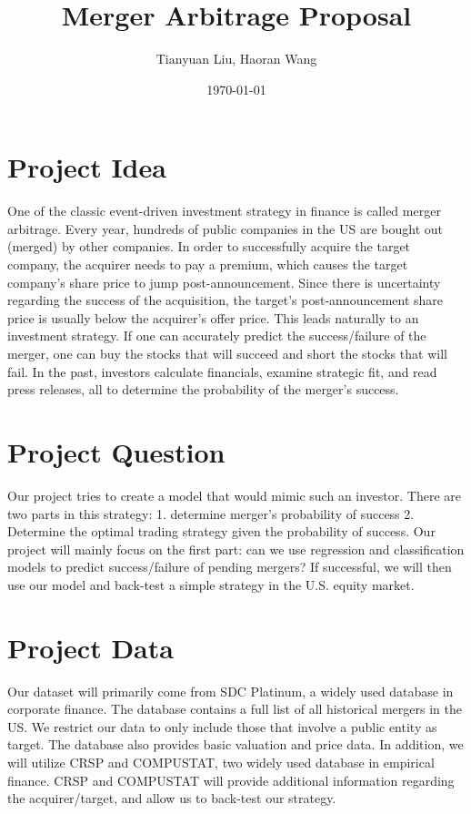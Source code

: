 \documentclass[a4paper]{article}
\title{Merger Arbitrage Proposal}
\author{Tianyuan Liu, Haoran Wang}
\date{\today}
\begin{document}
\maketitle

\section{Project Idea}
\label{sec:idea}

One of the classic event-driven investment strategy in finance is called merger arbitrage. Every year, hundreds of public companies in the US are bought out (merged) by other companies. In order to successfully acquire the target company, the acquirer needs to pay a premium, which causes the target company’s share price to jump post-announcement. Since there is uncertainty regarding the success of the acquisition, the target’s post-announcement share price is usually below the acquirer’s offer price. This leads naturally to an investment strategy. If one can accurately predict the success/failure of the merger, one can buy the stocks that will succeed and short the stocks that will fail. In the past, investors calculate financials, examine strategic fit, and read press releases, all to determine the probability of the merger’s success. 

\section{Project Question}
\label{sec:question}

Our project tries to create a model that would mimic such an investor. There are two parts in this strategy: 1. determine merger’s probability of success 2. Determine the optimal trading strategy given the probability of success. Our project will mainly focus on the first part: can we use regression and classification models to predict success/failure of pending mergers? If successful, we will then use our model and back-test a simple strategy in the U.S. equity market.

\section{Project Data}
\label{sec:data}

Our dataset will primarily come from SDC Platinum, a widely used database in corporate finance. The database contains a full list of all historical mergers in the US. We restrict our data to only include those that involve a public entity as target. The database also provides basic valuation and price data. In addition, we will utilize CRSP and COMPUSTAT, two widely used database in empirical finance. CRSP and COMPUSTAT will provide additional information regarding the acquirer/target, and allow us to back-test our strategy.
\end{document}
